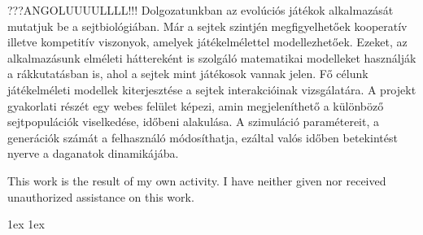 \documentclass[final]{ubb_dolgozat}
\author{%
Kis Nándor
}
\renewcommand{\baselinestretch}{1.5}
\begin{document}
\begin{abstractEN} %



{
	???ANGOLUUUULLLL!!!
	Dolgozatunkban az evolúciós játékok alkalmazását mutatjuk be a sejtbiológiában. Már a sejtek szintjén megfigyelhetőek kooperatív illetve kompetitív viszonyok, amelyek játékelmélettel modellezhetőek. Ezeket, az alkalmazásunk elméleti háttereként is szolgáló matematikai modelleket használják a rákkutatásban is, ahol a sejtek mint játékosok vannak jelen. Fő célunk játékelméleti modellek kiterjesztése a sejtek interakcióinak vizsgálatára. A projekt gyakorlati részét egy webes felület képezi, amin megjeleníthető a különböző sejtpopulációk viselkedése, időbeni alakulása. A szimuláció paramétereit, a generációk számát a felhasználó módosíthatja, ezáltal valós időben betekintést nyerve a daganatok dinamikájába.
}

This work is the result of my own activity. I have neither given nor received unauthorized assistance on this work.

\end{abstractEN}

\maketitle


{ \baselineskip 1ex
  \parskip 1ex
  \tableofcontents
}








{ \renewcommand{\baselinestretch}{0.8}\normalsize %
  \setlength{\itemsep}{-2.4mm}
  \setlength{\bibspacing}{0.67\baselineskip}
  
  
}
\end{document}
